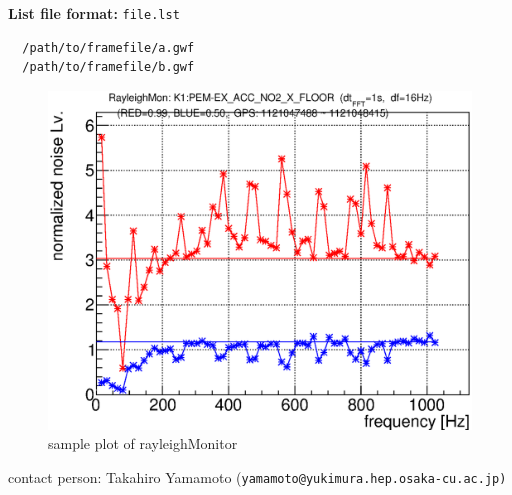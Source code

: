 {\noindent \bf List file format:} {\tt file.lst}
{\footnotesize
\begin{verbatim}
  /path/to/framefile/a.gwf
  /path/to/framefile/b.gwf

\end{verbatim}
}

\begin{figure}[t]
 \begin{center}
    \includegraphics[width=0.9\hsize]{fig/RayleighMon/sample1.eps}
    \caption{sample plot of rayleighMonitor}
 \end{center}
\end{figure}

{\noindent \small contact person: Takahiro Yamamoto (\tt yamamoto@yukimura.hep.osaka-cu.ac.jp)}

